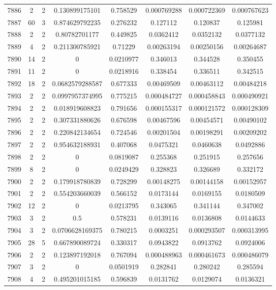 \begin{longtable}{|c|c|c|c|c|c|c|c|}
7886 & 2 & 2 & 0.130899175101 & 0.758529 & 0.000769288 & 0.000722369 & 0.000767623 \\
7887 & 60 & 3 & 0.874629792235 & 0.276232 & 0.127112 & 0.120837 & 0.125981 \\
7888 & 2 & 2 & 0.80782701177 & 0.449825 & 0.0362412 & 0.0352132 & 0.0377132 \\
7889 & 4 & 2 & 0.211300785921 & 0.71229 & 0.00263194 & 0.00250156 & 0.00264687 \\
7890 & 14 & 2 & 0 & 0.0210977 & 0.346013 & 0.344528 & 0.350455 \\
7891 & 11 & 2 & 0 & 0.0218916 & 0.338454 & 0.336511 & 0.342515 \\
7892 & 18 & 2 & 0.0682579288587 & 0.677333 & 0.00469509 & 0.00463112 & 0.00484218 \\
7893 & 2 & 2 & 0.0997957374995 & 0.775215 & 0.000484727 & 0.000458843 & 0.000490921 \\
7894 & 2 & 2 & 0.018919608823 & 0.791656 & 0.000155317 & 0.000121572 & 0.000128309 \\
7895 & 2 & 2 & 0.307331880626 & 0.676598 & 0.00467596 & 0.00454571 & 0.00490102 \\
7896 & 2 & 2 & 0.220842134654 & 0.724546 & 0.00201504 & 0.00198291 & 0.00209202 \\
7897 & 2 & 2 & 0.954632188931 & 0.407068 & 0.0475321 & 0.0460638 & 0.0492886 \\
7898 & 2 & 2 & 0 & 0.0819087 & 0.255368 & 0.251915 & 0.257656 \\
7899 & 8 & 2 & 0 & 0.0249429 & 0.328823 & 0.326689 & 0.332172 \\
7900 & 2 & 2 & 0.179918780839 & 0.728299 & 0.00148275 & 0.00144158 & 0.00152957 \\
7901 & 2 & 2 & 0.554203660039 & 0.566152 & 0.0173144 & 0.0169155 & 0.0180509 \\
7902 & 12 & 2 & 0 & 0.0213795 & 0.343065 & 0.341144 & 0.347002 \\
7903 & 3 & 2 & 0.5 & 0.578231 & 0.0139116 & 0.0136808 & 0.0144633 \\
7904 & 3 & 2 & 0.0706628169375 & 0.780215 & 0.0003251 & 0.000293507 & 0.000313995 \\
7905 & 28 & 5 & 0.667890089724 & 0.330317 & 0.0943822 & 0.0913762 & 0.0924006 \\
7906 & 2 & 2 & 0.123897192018 & 0.767094 & 0.000488963 & 0.000461673 & 0.000486079 \\
7907 & 3 & 2 & 0 & 0.0501919 & 0.282841 & 0.280242 & 0.285594 \\
7908 & 4 & 2 & 0.495201015185 & 0.596839 & 0.0131762 & 0.0129074 & 0.0136321 \\

\end{longtable}
